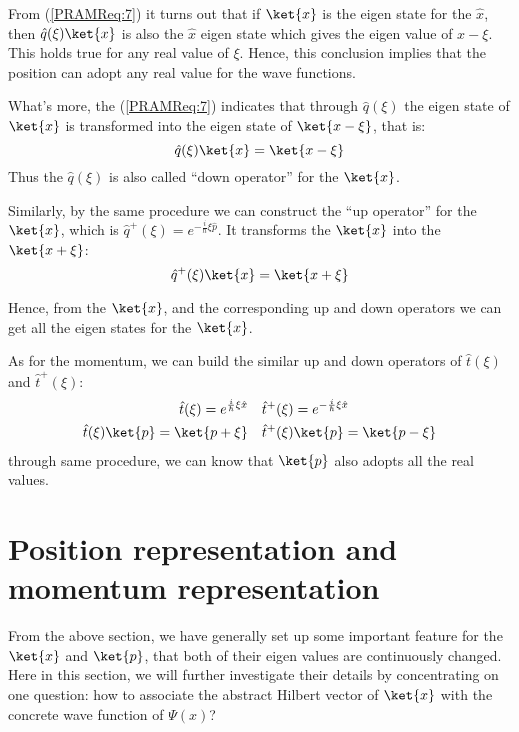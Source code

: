 From (\ref{PRAMReq:7}) it turns out that if $\ket{x}$ is the eigen
state for the $\hat{x}$, then $\hat{q}(\xi)\ket{x}$ is also the
$\hat{x}$ eigen state which gives the eigen value of $x - \xi$. This
holds true for any real value of $\xi$. Hence, this conclusion implies
that the position can adopt any real value for the wave functions.

What's more, the (\ref{PRAMReq:7}) indicates that through
$\hat{q}(\xi)$ the eigen state of $\ket{x}$ is transformed into the
eigen state of $\ket{x - \xi}$, that is:
\begin{equation}
  \label{PRAMReq:8}
  \hat{q}(\xi)\ket{x} = \ket{x - \xi}
\end{equation}
Thus the $\hat{q}(\xi)$ is also called ``down operator'' for the
$\ket{x}$.

Similarly, by the same procedure we can construct the ``up operator''
for the $\ket{x}$, which is $\hat{q}^{+}(\xi) =
e^{-\frac{i}{\hbar}\xi\hat{p}}$. It transforms the $\ket{x}$ into the
$\ket{x + \xi}$:
\begin{equation}
  \label{PRAMReq:9}
    \hat{q}^{+}(\xi)\ket{x} = \ket{x + \xi}
\end{equation}

Hence, from the $\ket{x}$, and the corresponding up and down operators
we can get all the eigen states for the $\ket{x}$.

As for the momentum, we can build the similar up and down operators of
$\hat{t}(\xi)$ and $\hat{t}^{+}(\xi)$:
\begin{align}
  \label{PRAMReq:10}
  \hat{t}(\xi) = e^{\frac{i}{\hbar}\xi\hat{x}} &\quad \hat{t}^{+}(\xi) =
  e^{-\frac{i}{\hbar}\xi\hat{x}} \nonumber \\
 \hat{t}(\xi)\ket{p} = \ket{p + \xi} &\quad \hat{t}^{+}(\xi)\ket{p} =
 \ket{p - \xi}
\end{align}
through same procedure, we can know that $\ket{p}$ also adopts all the
real values.


\section{Position representation and momentum representation}
\label{sec:PRAMR_in_position_representation}
%
%
From the above section, we have generally set up some important
feature for the $\ket{x}$ and $\ket{p}$, that both of their eigen
values are continuously changed. Here in this section, we will further
investigate their details by concentrating on one question: how to
associate the abstract Hilbert vector of $\ket{x}$ with the concrete
wave function of $\Psi(x)$?

